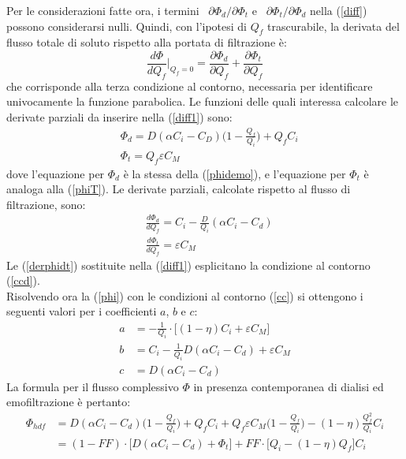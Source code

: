 Per le considerazioni fatte ora, i termini ~$\partial \Phi_d/\partial \Phi_t$ e ~$\partial \Phi_t/\partial \Phi_d$ nella (\ref{diff}) possono considerarsi nulli. Quindi, con l'ipotesi di $Q_f$ trascurabile, la derivata del flusso totale di soluto rispetto alla portata di filtrazione è:\\
\begin{equation}\label{diff1}
	\frac{d\Phi}{dQ_f}\Biggr\rvert_{Q_f=0} = \frac{\partial \Phi_d}{\partial Q_f} + \frac{\partial \Phi_t}{\partial Q_f}
\end{equation}
che corrisponde alla terza condizione al contorno, necessaria per identificare univocamente la funzione parabolica.
Le funzioni delle quali interessa calcolare le derivate parziali da inserire nella (\ref{diff1}) sono:
\begin{subequations}\label{phidt}
		\begin{align}
			&\Phi_d = D (\alpha C_i - C_D)\biggl(1-\frac{Q_f}{Q_i}\biggr) + Q_f C_i\\
			&\Phi_t = Q_f \varepsilon C_M\label{phit}
		\end{align}
	\end{subequations}
dove l'equazione per $\Phi_d$ è la stessa della (\ref{phidemo}), e l'equazione per $\Phi_t$ è analoga alla (\ref{phiT}). Le derivate parziali, calcolate rispetto al flusso di filtrazione, sono:
\begin{subequations}\label{derphidt}
		\begin{align}
			&\frac{d\Phi_d}{dQ_f} = C_i -\frac{D}{Q_i}(\alpha C_i - C_d)\\
			&\frac{d\Phi_t}{dQ_f} = \varepsilon C_M
		\end{align}
	\end{subequations}
Le (\ref{derphidt}) sostituite nella (\ref{diff1}) esplicitano la condizione al contorno (\ref{ccd}).\\
Risolvendo ora la (\ref{phi}) con le condizioni al contorno (\ref{cc}) si ottengono i seguenti valori per i coefficienti $a$, $b$ e $c$:\\
\begin{align*}
	a& = -\frac{1}{Q_i}\cdot \biggl[(1-\eta)C_i + \varepsilon C_M\biggr]\\
	b& = C_i - \frac{1}{Q_i}D(\alpha C_i - C_d)+ \varepsilon C_M\\
	c& = D(\alpha C_i - C_d)
\end{align*}
La formula per il flusso complessivo $\Phi$ in presenza contemporanea di dialisi ed emofiltrazione è pertanto:
\begin{equation}\label{phihdf}
	\begin{split}
	 \Phi_{hdf}& = D(\alpha C_i - C_d)\biggl(1-\frac{Q_f}{Q_i}\biggr)+Q_f C_i + Q_f \varepsilon C_M\biggl(1-\frac{Q_f}{Q_i}\biggr) - (1-\eta)\frac{Q_f^2}{Q_i}C_i\\
		                & = (1-FF)\cdot \biggl[D(\alpha C_i - C_d)+\Phi_t \biggr] + FF\cdot \biggl[Q_i-(1-\eta)Q_f\biggr] C_i
	\end{split}
\end{equation}
